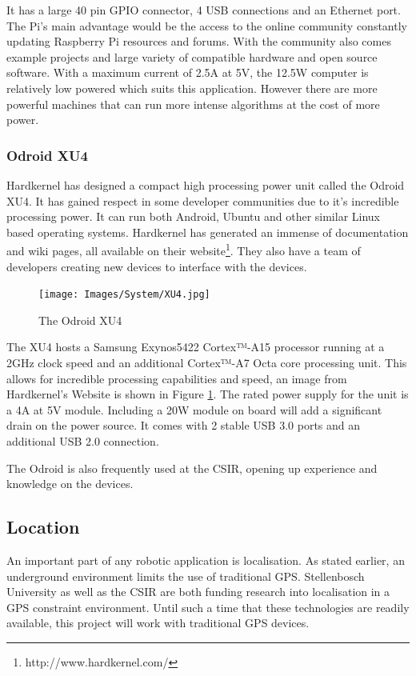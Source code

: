 			It has a large 40 pin GPIO connector, 4 USB connections and an Ethernet port. The Pi's main advantage would be the access to the online community constantly updating Raspberry Pi resources and forums. With the community also comes example projects and large variety of compatible hardware and open source software. With a maximum current of 2.5A at 5V, the 12.5W computer is relatively low powered which suits this application. However there are more powerful machines that can run more intense algorithms at the cost of more power.
	
			\subsubsection{Odroid XU4}
			Hardkernel has designed a compact high processing power unit called the Odroid XU4. It has gained respect in some developer communities due to it's incredible processing power. It can run both Android, Ubuntu and other similar Linux based operating systems. Hardkernel has generated an immense of documentation and wiki pages, all available on their website\footnote{http://www.hardkernel.com/}. They also have a team of developers creating new devices to interface with the devices. 
			
			\begin{figure}[H]
				\centering
				\texttt{[image: Images/System/XU4.jpg]}     
				\caption{The Odroid XU4}
				\label{IM_Odroid}
			\end{figure}
			
			The XU4 hosts a Samsung Exynos5422 Cortex™-A15 processor running at a 2GHz clock speed and an additional Cortex™-A7 Octa core processing unit. This allows for incredible processing capabilities and speed, an image from Hardkernel's Website is shown in Figure \ref{IM_Odroid}. The rated power supply for the unit is a 4A at 5V module. Including a 20W module on board will add a significant drain on the power source. It comes with 2 stable USB 3.0 ports and an additional USB 2.0 connection. 
			
			The Odroid is also frequently used at the CSIR, opening up experience and knowledge on the devices.
		
		
		\subsection{Location}
		An important part of any robotic application is localisation. As stated earlier, an underground environment limits the use of traditional GPS. Stellenbosch University as well as the CSIR are both funding research into localisation in a GPS constraint environment. Until such a time that these technologies are readily available, this project will work with traditional GPS devices.
		
